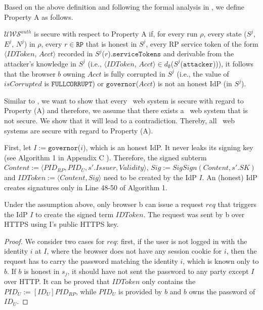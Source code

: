 \vspace{1mm} Based on the above definition and following the formal analysis in \cite{SPRESSO}, we define Property A as follows.

\begin{definition}
$\mathcal{U\!W\!S}^{auth}$ is secure with respect to Property A if, for every run $\rho$, every state ($S^j$, $E^j$, $N^j$) in $\rho$, every $r \in \mathtt{RP}$ that is honest in $S^j$, every RP service token of the form $\langle IDToken$, $Acct \rangle$ recorded in $S^j$($r$).$\mathtt{serviceTokens}$ and derivable from the attacker's knowledge in $S^j$ (i.e., $\langle IDToken$, $Acct \rangle \in d_{\emptyset}$($S^j$($\mathtt{attacker}$))), it follows that the browser $b$ owning $Acct$ is fully corrupted in $S^j$ (i.e., the value of $isCorrupted$ is $\mathtt{FULLCORRUPT}$) or $\mathtt{governor}$($Acct$) is not an honest IdP (in $S^j$).
\end{definition}

Similar to \cite{SPRESSO}, we want to show that every \usso\ web system is secure with regard to Property (A) and therefore, we assume that there exists a \usso\ web system that is not secure. We show that it will lead to a contradiction. Thereby, all \usso\ web systems are secure with regard to Property (A).

First, let $I:=\mathtt{governor}$($i$), which is an honest IdP. It never leaks its signing key (see Algorithm 1 in Appendix C%
). Therefore, the signed subterm $Content:= \langle PID_{RP}, PID_U, s'.Issuer, Validity \rangle$, $Sig:= SigSign(Content, s'.SK)$ and $IDToken:= \langle Content, Sig \rangle$ need to be created by the IdP $I$.  An (honest) IdP creates signatures only in Line 48-50 of Algorithm 1.%

\begin{lemma}
\label{lemma-user-request}
Under the assumption above, only browser b can issue a request $req$ that triggers the IdP $I$ to create the signed term $IDToken$. The request was sent by b over HTTPS using I's public HTTPS key.
\end{lemma}

\begin{proof}
We consider two cases for $req$: first, if the user is not logged in with the identity $i$ at $I$, where the browser does not have any session cookie for $i$, then the request has to carry the password matching the identity $i$, which is known only to $b$. If $b$ is honest in $s_j$, it should have not sent the password to any party except $I$ over HTTP. It can be proved that $IDToken$ only contains the $PID_U:=[ID_U]PID_{RP}$, while $PID_U$ is provided by $b$ and $b$ owns the password of $ID_U$.
\end{proof}








